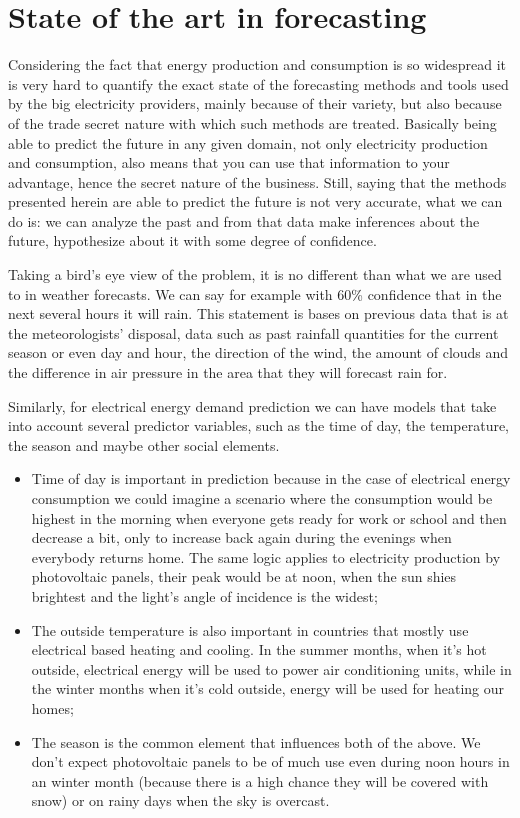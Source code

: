 \documentclass[12pt,a4paper,titlepage]{report}
\begin{document}
\section{State of the art in forecasting}

Considering the fact that energy production and consumption is so widespread it is very hard to quantify the exact state of the forecasting methods and tools used by the big electricity providers, mainly because of their variety, but also because of the trade secret nature with which such methods are treated. Basically being able to predict the future in any given domain, not only electricity production and consumption, also means that you can use that information to your advantage, hence the secret nature of the business. Still, saying that the methods presented herein are able to predict the future is not very accurate, what we can do is: we can analyze the past and from that data make inferences about the future, hypothesize about it with some degree of confidence.

Taking a bird's eye view of the problem, it is no different than what we are used to in weather forecasts. We can say for example with 60\% confidence that in the next several hours it will rain. This statement is bases on previous data that is at the meteorologists' disposal, data such as past rainfall quantities for the current season or even day and hour, the direction of the wind, the amount of clouds and the difference in air pressure in the area that they will forecast rain for.

Similarly, for electrical energy demand prediction we can have models that take into account several predictor variables, such as the time of day, the temperature, the season and maybe other social elements.
\begin{itemize}
    \item Time of day is important in prediction because in the case of electrical energy consumption we could imagine a scenario where the consumption would be highest in the morning when everyone gets ready for work or school and then decrease a bit, only to increase back again during the evenings when everybody returns home. The same logic applies to electricity production by photovoltaic panels, their peak would be at noon, when the sun shies brightest and the light's angle of incidence is the widest;
    \item The outside temperature is also important in countries that mostly use electrical based heating and cooling. In the summer months, when it's hot outside, electrical energy will be used to power air conditioning units, while in the winter months when it's cold outside, energy will be used for heating our homes;
    \item The season is the common element that influences both of the above. We don't expect photovoltaic panels to be of much use even during noon hours in an winter month (because there is a high chance they will be covered with snow) or on rainy days when the sky is overcast.
\end{itemize}
\end{document}
